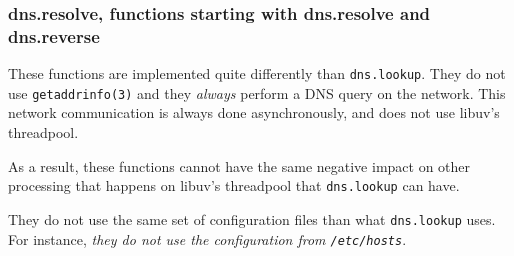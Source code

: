\subsubsection{dns.resolve, functions starting with dns.resolve and
dns.reverse}\label{dns.resolve-functions-starting-with-dns.resolve-and-dns.reverse}

These functions are implemented quite differently than
\texttt{dns.lookup}. They do not use \texttt{getaddrinfo(3)} and they
\emph{always} perform a DNS query on the network. This network
communication is always done asynchronously, and does not use libuv's
threadpool.

As a result, these functions cannot have the same negative impact on
other processing that happens on libuv's threadpool that
\texttt{dns.lookup} can have.

They do not use the same set of configuration files than what
\texttt{dns.lookup} uses. For instance, \emph{they do not use the
configuration from \texttt{/etc/hosts}}.
